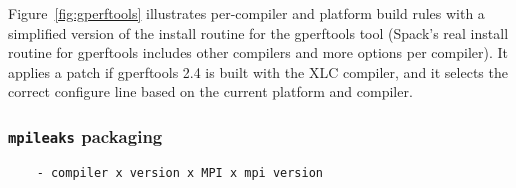 Figure~\ref{fig:gperftools} illustrates per-compiler and platform build rules with 
a simplified version of the install routine for the gperftools tool (Spack's real 
install routine for gperftools includes other compilers and more options per
compiler).  It applies a patch if gperftools 2.4 is built with the XLC compiler, 
and it selects the correct configure line based on the current platform and compiler.  

\subsubsection{{\tt mpileaks} packaging}
\begin{verbatim}
	- compiler x version x MPI x mpi version
\end{verbatim}

